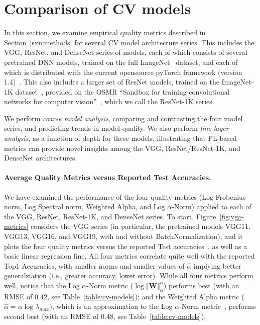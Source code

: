 \section{Comparison of CV models}
\label{sxn:cv}

In this section, we examine empirical quality metrics described in Section~\ref{sxn:methods} for several CV model architecture series.
This includes the VGG, ResNet, and DenseNet series of models, each of which consists of several pretrained DNN models, trained on the full ImageNet~\cite{imagenet} dataset, and each of which is distributed with the current opensource pyTorch framework (version 1.4)~\cite{pyTorch}.
This also includes a larger set of ResNet models, trained on the ImageNet-1K dataset~\cite{imagenet1k}, provided on the OSMR ``Sandbox for training convolutional networks for computer vision''~\cite{osmr}, which we call the ResNet-1K series.

We perform \emph{coarse model analysis}, comparing and contrasting the four model series, and predicting trends in model quality. 
We also perform \emph{fine layer analysis}, as a function of depth for these models, illustrating that PL-based metrics can provide novel insights among the VGG, ResNet/ResNet-1K, and DenseNet architectures. 

\paragraph{Average Quality Metrics versus Reported Test Accuracies.}
We have examined the performance of the four quality metrics (Log Frobenius norm, Log Spectral norm, Weighted Alpha, and Log $\alpha$-Norm) applied to each of the VGG, ResNet, ResNet-1K, and DenseNet series.
To start, Figure~\ref{fig:vgg-metrics} considers the VGG series (in particular, the pretrained models VGG11, VGG13, VGG16, and VGG19, with and without BatchNormalization), and it plots the four quality metrics versus the reported Test accuracies~\cite{pyTorchVgg}, as well as a basic linear regression line. 
All four metrics correlate quite well with the reported Top1 Accuracies, with smaller norms and smaller values of $\hat{\alpha}$ implying better generalziation (i.e., greater accuracy, lower error). 
While all four metrics perform well, notice that the Log $\alpha$-Norm metric ($\log\Vert\mathbf{W}\Vert_{\alpha}^{\alpha}$) performs best (with an RMSE of $0.42$, see Table~\ref{table:cv-models}); and the Weighted Alpha metric ($\hat\alpha =\alpha\log\lambda_{max} $), which is an approximation to the Log $\alpha$-Norm metric~\cite{MM20_unpub_work}, performs second best (with an RMSE of $0.48$, see Table~\ref{table:cv-models}).

